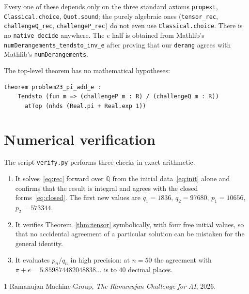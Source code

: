 \documentclass[11pt]{article}
\theoremstyle{remark}
\begin{document}
Every one of these depends only on the three standard axioms
\texttt{propext}, \texttt{Classical.choice}, \texttt{Quot.sound}; the purely
algebraic ones (\texttt{tensor\_rec}, \texttt{challengeQ\_rec},
\texttt{challengeP\_rec}) do not even use \texttt{Classical.choice}. There is no
\texttt{native\_decide} anywhere. The $e$ half is obtained from Mathlib's
\texttt{numDerangements\_tendsto\_inv\_e} after proving that our \texttt{derang}
agrees with Mathlib's \texttt{numDerangements}.

The top-level theorem has no mathematical hypotheses:
\begin{verbatim}
theorem problem23_pi_add_e :
    Tendsto (fun m => (challengeP m : R) / (challengeQ m : R))
      atTop (nhds (Real.pi + Real.exp 1))
\end{verbatim}

\section{Numerical verification}\label{sec:numeric}

The script \texttt{verify.py} performs three checks in exact arithmetic.
\begin{enumerate}
\item It solves~\eqref{eq:rec} forward over $\mathbb{Q}$ from the initial
data~\eqref{eq:init} alone and confirms that the result is integral and agrees
with the closed forms~\eqref{eq:closed}. The first new values are
$q_1 = 1836$, $q_2 = 97680$, $p_1 = 10656$, $p_2 = 573344$.
\item It verifies Theorem~\ref{thm:tensor} symbolically, with four free initial
values, so that no accidental agreement of a particular solution can be
mistaken for the general identity.
\item It evaluates $p_n/q_n$ in high precision: at $n=50$ the agreement with
$\pi+e = 5.859874482048838\ldots$ is to $40$ decimal places.
\end{enumerate}

\begin{thebibliography}{1}
Ramanujan Machine Group,
\emph{The Ramanujan Challenge for AI}, 2026.

\end{thebibliography}
\end{document}

